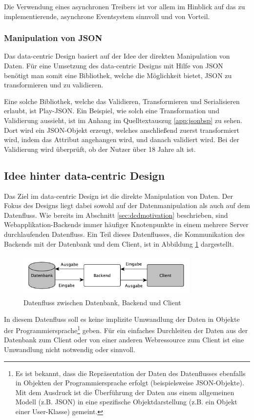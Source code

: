 Die Verwendung eines asynchronen Treibers ist vor allem im Hinblick auf das zu implementierende, asynchrone Eventsystem sinnvoll und von Vorteil. 

\subsubsection{Manipulation von JSON}
Das data-centric Design basiert auf der Idee der direkten Manipulation von Daten. Für eine Umsetzung des data-centric Designs mit Hilfe von JSON benötigt man somit eine Bibliothek, welche die Möglichkeit bietet, JSON zu transformieren und zu validieren.
 
Eine solche Bibliothek, welche das Validieren, Transformieren und Serialisieren erlaubt, ist Play-JSON. Ein Beispiel, wie solch eine Transformation und Validierung aussieht, ist im Anhang im Quelltextauszug \ref{app:jsonbsp} zu sehen. Dort wird ein JSON-Objekt erzeugt, welches anschließend zuerst transformiert wird, indem das Attribut  angehangen wird, und danach validiert wird. Bei der Validierung wird überprüft, ob der Nutzer über 18 Jahre alt ist.

\subsection{Idee hinter data-centric Design}
Das Ziel im data-centric Design ist die direkte Manipulation von Daten. Der Fokus des Designs liegt dabei sowohl auf der Datenmanipulation als auch auf dem Datenfluss. Wie bereits im Abschnitt \ref{sec:dcdmotivation} beschrieben, sind Webapplikation-Backends immer häufiger Knotenpunkte in einem mehrere Server durchlaufenden Datenfluss. Ein Teil dieses Datenflusses, die Kommunikation des Backends mit der Datenbank und dem Client, ist in Abbildung \ref{fig:dataflow} dargestellt. 

\begin{figure}[h]   
  \centering     
  \includegraphics[width=0.8\textwidth]{img/dataflow_dcd.pdf}  
   \caption{Datenfluss zwischen Datenbank, Backend und Client}   
  \label{fig:dataflow} 
\end{figure}

In diesem Datenfluss soll es keine implizite Umwandlung der Daten in Objekte der Programmiersprache\footnote{Es ist bekannt, dass die Repräsentation der Daten des Datenflusses ebenfalls in Objekten der Programmiersprache erfolgt (beispielsweise JSON-Objekte). Mit dem Ausdruck ist die Überführung der Daten aus einem allgemeinen Modell (z.B. JSON) in eine spezifische Objektdarstellung (z.B. ein Objekt einer User-Klasse) gemeint.} geben. Für ein einfaches Durchleiten der Daten aus der Datenbank zum Client oder von einer anderen Webressource zum Client ist eine Umwandlung nicht notwendig oder sinnvoll. 

